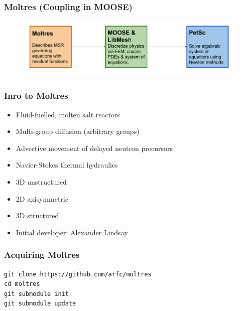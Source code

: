 \begin{frame}
        \frametitle{Moltres (Coupling in MOOSE)}
  \begin{figure}
   \vspace{-0.05in}
   \hspace*{-0.15in}
   \includegraphics[width=1.1\textwidth]{./images/moltres-moose-diag.png}
    \end{figure}
\end{frame}

\begin{frame}
        \frametitle{Inro to Moltres}
        \begin{itemize}  
                \item Fluid-fuelled, molten salt reactors
                \item Multi-group diffusion (arbitrary groups)
                \item Advective movement of delayed neutron precursors
                \item Navier-Stokes thermal hydraulics
                \item 3D unstructured
                \item 2D axisymmetric
                \item 3D structured 
                \item Initial developer: Alexander Lindsay
        \end{itemize}
\end{frame}

\begin{frame}
        \frametitle{Acquiring Moltres}
             \texttt{git clone https://github.com/arfc/moltres}\\
        \texttt{cd moltres}\\
        \texttt{git submodule init}\\
        \texttt{git submodule update}\\
\end{frame}

